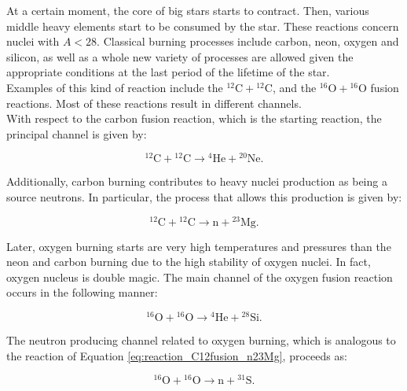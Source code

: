\documentclass[openany]{book}
\begin{document}
At a certain moment, the core of big stars starts to contract. Then, various middle heavy elements start to be consumed by the star. These reactions concern nuclei with $A < 28$. Classical burning processes include carbon, neon, oxygen and silicon, as well as a whole new variety of processes are allowed given the appropriate conditions at the last period of the lifetime of the star. \\

Examples of this kind of reaction include the $\mathrm{{}^{12}C + {}^{12}C}$,   and the  $\mathrm{{}^{16}O + {}^{16}O}$ fusion reactions.   Most of these reactions result in different channels. \\


With respect to the carbon fusion reaction, which is the starting reaction,  the principal channel is given by: 

\begin{equation} \label{eq:reaction_C12fusion_alpha20Ne}
	\mathrm{{}^{12}C + {}^{12}C \rightarrow {}^{4}He + {}^{20}Ne}. 
\end{equation}

Additionally, carbon burning contributes to heavy nuclei production as being a source neutrons. In particular, the process that allows this production is given by:

\begin{equation} \label{eq:reaction_C12fusion_n23Mg}
	\mathrm{{}^{12}C + {}^{12}C \rightarrow n  + {}^{23}Mg}. 
\end{equation}

Later, oxygen burning starts are very high temperatures and pressures than the neon and carbon burning due to the high stability of oxygen nuclei. In fact, oxygen nucleus is double magic. The main channel of the oxygen fusion reaction occurs in the following manner:

\begin{equation} \label{eq:reaction_O12fusion_alpha28Si}
	\mathrm{{}^{16}O + {}^{16}O \rightarrow {}^{4}He + {}^{28}Si}. 
\end{equation}

The neutron producing channel related to oxygen burning, which is analogous to the reaction of Equation \ref{eq:reaction_C12fusion_n23Mg}, proceeds as: 

\begin{equation} \label{eq:reaction_O12fusion_n31S}
	\mathrm{{}^{16}O + {}^{16}O \rightarrow n + {}^{31}S}. 
\end{equation}
\end{document}
